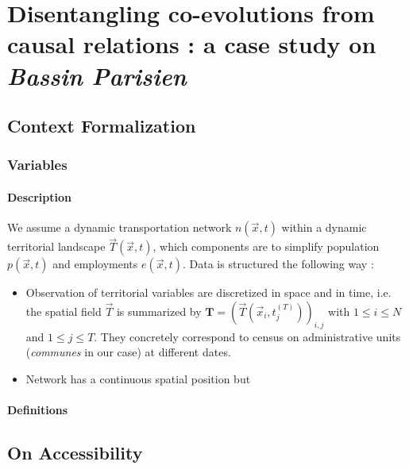 

\newpage

\section{Disentangling co-evolutions from causal relations : a case study on \emph{Bassin Parisien}}




\subsection{Context Formalization}

\subsubsection{Variables}

\paragraph{Description}

We assume a dynamic transportation network $n(\vec{x},t)$ within a dynamic territorial landscape $\vec{T}(\vec{x},t)$, which components are to simplify population $p(\vec{x},t)$ and employments $e(\vec{x},t)$. Data is structured the following way :
\begin{itemize}
\item Observation of territorial variables are discretized in space and in time, i.e. the spatial field $\vec{T}$ is summarized by $\mathbf{T} = \left(\vec{T}(\vec{x}_i,t_j^{(T)})\right)_{i,j}$ with $1\leq i \leq N$ and $1\leq j \leq T$. They concretely correspond to census on administrative units (\emph{communes} in our case) at different dates.
\item Network has a continuous spatial position but
\end{itemize}



\paragraph{Definitions}



\subsection{On Accessibility}

